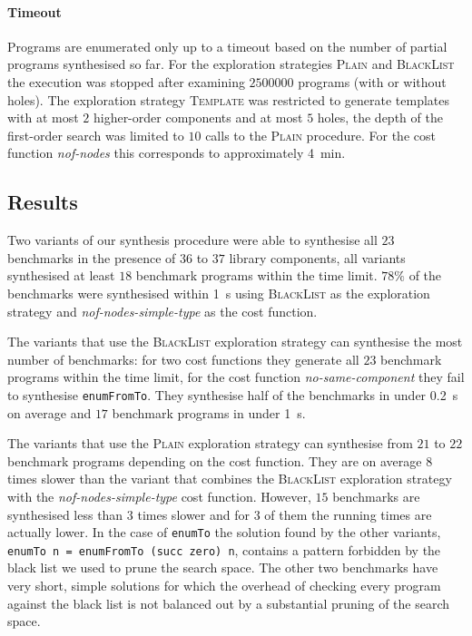\paragraph{Timeout} Programs are enumerated only up to a timeout based on the number of partial programs synthesised so far. For the exploration strategies \textsc{Plain} and \textsc{BlackList} the execution was stopped after examining $2500000$ programs (with or without holes). The exploration strategy \textsc{Template} was restricted to generate templates with at most $2$ higher-order components and at most $5$ holes, the depth of the first-order search was limited to $10$ calls to the \textsc{Plain} procedure. For the cost function \textit{nof-nodes} this corresponds to approximately \SI{4}{min}.

\subsection{Results}\label{Table summary}
Two variants of our synthesis procedure were able to synthesise all $23$ benchmarks in the presence of $36$ to $37$ library components, all variants synthesised at least $18$ benchmark programs within the time limit. $78\%$ of the benchmarks were synthesised within \SI{1}{s} using \textsc{BlackList} as the exploration strategy and \textit{nof-nodes-simple-type} as the cost function.

The variants that use the \textsc{BlackList} exploration strategy can synthesise the most number of benchmarks: for two cost functions they generate all $23$ benchmark programs within the time limit, for the cost function \textit{no-same-component} they fail to synthesise \lstinline?enumFromTo?. They synthesise half of the benchmarks in under \SI{0.2}{s} on average and $17$ benchmark programs in under \SI{1}{s}.

The variants that use the \textsc{Plain} exploration strategy can synthesise from $21$ to $22$ benchmark programs depending on the cost function. They are on average $8$ times slower than the variant that combines the \textsc{BlackList} exploration strategy with the \textit{nof-nodes-simple-type} cost function. However, $15$ benchmarks are synthesised less than $3$ times slower and for $3$ of them the running times are actually lower. In the case of \lstinline?enumTo? the solution found by the other variants, \lstinline?enumTo n = enumFromTo (succ zero) n?, contains a pattern forbidden by the black list we used to prune the search space. The other two benchmarks have very short, simple solutions for which the overhead of checking every program against the black list is not balanced out by a substantial pruning of the search space.

